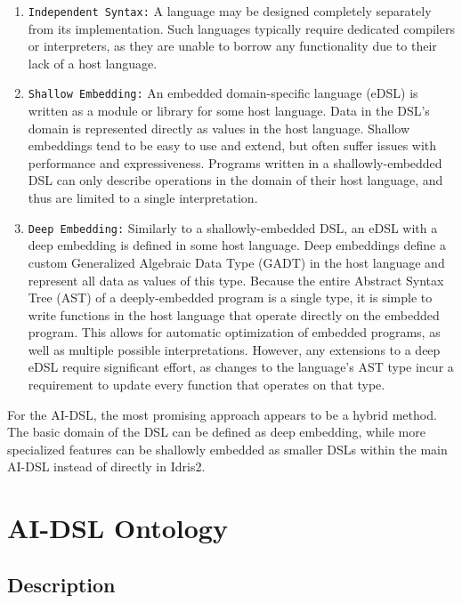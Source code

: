 \documentclass[]{report}
\begin{document}
\begin{enumerate}
  \item \texttt{Independent Syntax:} A language may be designed completely
        separately from its implementation.  Such languages typically require
        dedicated compilers or interpreters, as they are unable to borrow any
        functionality due to their lack of a host language.

  \item \texttt{Shallow Embedding:} An embedded domain-specific language (eDSL)
        is written as a module or library for some host language.  Data in the
        DSL's domain is represented directly as values in the host language.
        Shallow embeddings tend to be easy to use and extend, but often suffer
        issues with performance and expressiveness.  Programs written in a
        shallowly-embedded DSL can only describe operations in the domain of
        their host language, and thus are limited to a single interpretation.

  \item \texttt{Deep Embedding:} Similarly to a shallowly-embedded DSL,
        an eDSL with a deep embedding is defined in some host language.
        Deep embeddings define a custom Generalized Algebraic Data Type
        (GADT) in the host language and represent
        all data as values of this type.  Because the entire Abstract Syntax
        Tree (AST) of a deeply-embedded program is a single type, it is simple to
        write functions in the host language that operate directly on the
        embedded program. This allows for automatic optimization of embedded
        programs, as well as multiple possible interpretations.  However, any
        extensions to a deep eDSL require significant effort, as changes to the
        language's AST type incur a requirement to update every function that
        operates on that type.

\end{enumerate}
For the AI-DSL, the most promising approach appears to be a hybrid method.
The basic domain of the DSL can be defined as deep embedding, while more
specialized features can be shallowly embedded as smaller DSLs within the main
AI-DSL instead of directly in Idris2.

\chapter{AI-DSL Ontology}
\label{chap:aidsl_ontology}

\section{Description}
\end{document}
